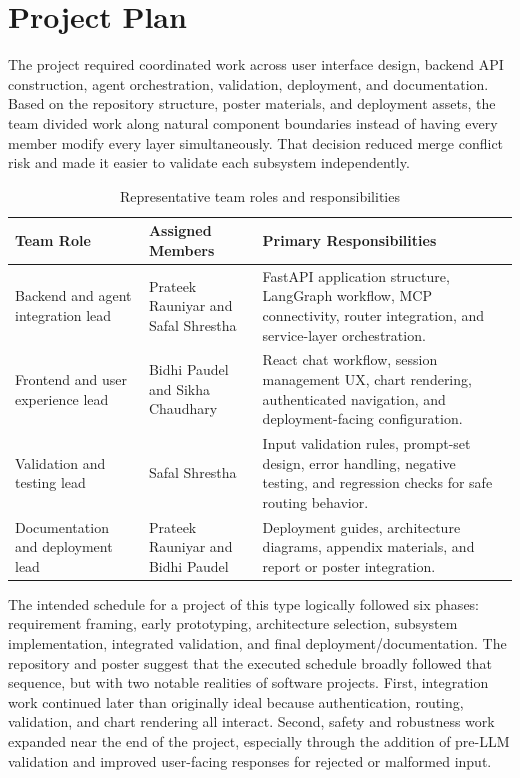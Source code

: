 \documentclass[12pt,oneside]{report}
\begin{document}
\section{Project Plan}

The project required coordinated work across user interface design, backend API construction, agent orchestration, validation, deployment, and documentation. Based on the repository structure, poster materials, and deployment assets, the team divided work along natural component boundaries instead of having every member modify every layer simultaneously. That decision reduced merge conflict risk and made it easier to validate each subsystem independently.

\begin{table}[H]
\centering
\caption{Representative team roles and responsibilities}
\label{tab:roles}
\small
\renewcommand{\arraystretch}{1.15}
\begin{tabular}{@{}>{\raggedright\arraybackslash}p{1.45in} >{\raggedright\arraybackslash}p{1.45in} >{\raggedright\arraybackslash}p{2.75in}@{}}
\toprule
\textbf{Team Role} & \textbf{Assigned Members} & \textbf{Primary Responsibilities} \\
\midrule
Backend and agent integration lead & Prateek Rauniyar and Safal Shrestha & FastAPI application structure, LangGraph workflow, MCP connectivity, router integration, and service-layer orchestration. \\
Frontend and user experience lead & Bidhi Paudel and Sikha Chaudhary & React chat workflow, session management UX, chart rendering, authenticated navigation, and deployment-facing configuration. \\
Validation and testing lead & Safal Shrestha & Input validation rules, prompt-set design, error handling, negative testing, and regression checks for safe routing behavior. \\
Documentation and deployment lead & Prateek Rauniyar and Bidhi Paudel & Deployment guides, architecture diagrams, appendix materials, and report or poster integration. \\
\bottomrule
\end{tabular}
\normalsize
\end{table}

The intended schedule for a project of this type logically followed six phases: requirement framing, early prototyping, architecture selection, subsystem implementation, integrated validation, and final deployment/documentation. The repository and poster suggest that the executed schedule broadly followed that sequence, but with two notable realities of software projects. First, integration work continued later than originally ideal because authentication, routing, validation, and chart rendering all interact. Second, safety and robustness work expanded near the end of the project, especially through the addition of pre-LLM validation and improved user-facing responses for rejected or malformed input.
\end{document}
